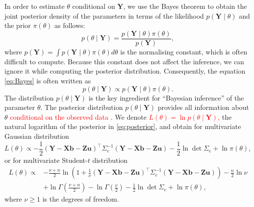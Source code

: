 \documentclass[a4paper]{article}   	%
\begin{document}
	In order to estimate $\theta$ conditional on $\bm{Y}$, we use the Bayes theorem to obtain the joint posterior density of the parameters in terms of the likelihood $p(\bm{Y}\mid\theta)$ and the prior $\pi(\theta)$ as follows:
	\begin{equation}\label{eq:Bayes}
		p(\theta\mid \bm{Y}) = \frac{p(\bm{Y}\mid\theta)\pi(\theta)}{p(\bm{Y})},
	\end{equation}
	where $p(\bm{Y}) = \int p(\bm{Y}\mid\theta)\pi(\theta) d\theta$ is the normalising constant, which is often difficult to compute. Because this constant does not affect the inference, we can ignore it while computing the posterior distribution. Consequently, the equation \eqref{eq:Bayes} is often written as 
	\begin{equation}\label{eq:posterior}
		p(\theta\mid \bm{Y}) \propto p(\bm{Y}\mid\theta)\pi(\theta).
	\end{equation}
The distribution $p(\theta\mid \bm{Y})$ is the key ingredient for ``Bayesian inference'' of the parameter $\theta$. The posterior distribution $p(\theta\mid \bm{Y})$ provides all information about $\theta$ \textcolor{red}{conditional on the observed data} \parencite{Che2010Bayesian}. We denote \textcolor{red}{$L(\theta)=\ln p(\theta\mid\bm{Y})$,} the natural logarithm of the posterior in \eqref{eq:posterior}, and obtain for multivariate Gaussian distribution 
	\begin{equation}\label{eq:logGpost}
		L(\theta) \propto -\frac{1}{2} (\bm{Y}-\bm{X}\bm{b}-\bm{Z}\bm{u})^\top \Sigma_e^{-1}(\bm{Y}-\bm{X}\bm{b}-\bm{Z}\bm{u}) -\frac{1}{2}\ln\det\Sigma_e + \ln \pi(\theta),
	\end{equation}
	or for multivariate Student-$t$ distribution
	\begin{equation}\label{eq:logTpost}
		\begin{split}
			L(\theta) \propto &-\frac{\nu+n}{2}\ln \left( 
			1+\frac{1}{\nu}(\bm{Y}-\bm{X}\bm{b}-\bm{Z}\bm{u})^\top\Sigma_e^{-1}(\bm{Y}-\bm{X}\bm{b}-\bm{Z}\bm{u})  \right) -\frac{n}{2}\ln\nu \\ &+ \ln \Gamma(\frac{\nu+n}{2}) - \ln\Gamma(\frac{\nu}{2})-\frac{1}{2}\ln\det \Sigma_e + \ln \pi(\theta),
		\end{split}
	\end{equation}
	where $\nu\geq 1$ is the degrees of freedom. 
	
\end{document}
